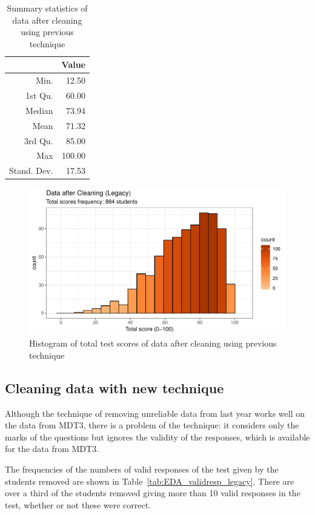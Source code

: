 \documentclass[a4paper]{report}
\begin{document}
\begin{table}[ht]
  \centering
  \begin{tabular}{rr}
    \hline
   & Value \\ 
    \hline
  Min. & 12.50 \\ 
    1st Qu. & 60.00 \\ 
    Median & 73.94 \\ 
    Mean & 71.32 \\ 
    3rd Qu. & 85.00 \\ 
    Max & 100.00 \\ 
    Stand. Dev. & 17.53 \\ 
     \hline
  \end{tabular}
  \caption{\label{tab:EDA_dsc_17clean_legacy}Summary statistics of data after cleaning using previous technique}
\end{table}

\begin{figure}[H]
  \centering
  \includegraphics[width=\linewidth]{fig/EDA_hist_17clean_legacy.pdf}
  \caption{\label{fig:EDA_hist_17clean_legacy}Histogram of total test scores of data after cleaning using previous technique}
\end{figure}

\subsection{Cleaning data with new technique}

Although the technique of removing unreliable data from last year works well on the data from MDT3, there is a problem of the technique: it considers only the marks of the questions but ignores the validity of the responses, which is available for the data from MDT3. 

The frequencies of the numbers of valid responses of the test given by the students removed are shown in Table~\ref{tab:EDA_validresp_legacy}. There are over a third of the students removed giving more than 10 valid responses in the test, whether or not these were correct. %
\end{document}
